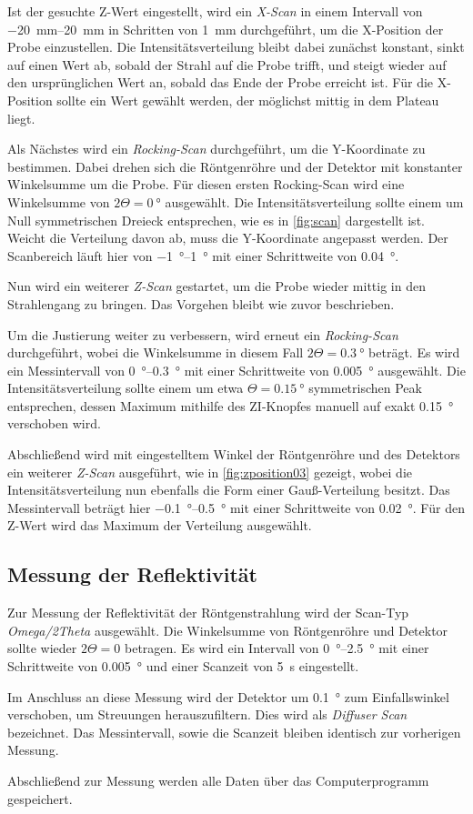 Ist der gesuchte Z-Wert eingestellt,
wird ein \emph{X-Scan} in einem Intervall von \SIrange{-20}{20}{\milli\meter} in Schritten von \SI{1}{\milli\meter} durchgeführt,
um die X-Position der Probe einzustellen.
Die Intensitätsverteilung bleibt dabei zunächst konstant,
sinkt auf einen Wert ab,
sobald der Strahl auf die Probe trifft,
und steigt wieder auf den ursprünglichen Wert an,
sobald das Ende der Probe erreicht ist.
Für die X-Position sollte ein Wert gewählt werden,
der möglichst mittig in dem Plateau liegt.

Als Nächstes wird ein \emph{Rocking-Scan} durchgeführt,
um die Y-Koordinate zu bestimmen.
Dabei drehen sich die Röntgenröhre und der Detektor mit konstanter Winkelsumme um die Probe.
Für diesen ersten Rocking-Scan wird eine Winkelsumme von $2 \Theta = \SI{0}{\degree}$ ausgewählt.
Die Intensitätsverteilung sollte einem um Null symmetrischen Dreieck entsprechen,
wie es in \autoref{fig:scan} dargestellt ist.
Weicht die Verteilung davon ab,
muss die Y-Koordinate angepasst werden.
Der Scanbereich läuft hier von \SIrange{-1}{1}{\degree} mit einer Schrittweite von \SI{0.04}{\degree}.

Nun wird ein weiterer \emph{Z-Scan} gestartet,
um die Probe wieder mittig in den Strahlengang zu bringen.
Das Vorgehen bleibt wie zuvor beschrieben.

Um die Justierung weiter zu verbessern,
wird erneut ein \emph{Rocking-Scan} durchgeführt,
wobei die Winkelsumme in diesem Fall $2 \Theta = \SI{0.3}{\degree}$ beträgt.
Es wird ein Messintervall von \SIrange{0}{0.3}{\degree} mit einer Schrittweite von \SI{0.005}{\degree} ausgewählt.
Die Intensitätsverteilung sollte einem um etwa $\Theta = \SI{0.15}{\degree}$ symmetrischen Peak entsprechen,
dessen Maximum mithilfe des ZI-Knopfes manuell auf exakt \SI{0.15}{\degree} verschoben wird.

Abschließend wird mit eingestelltem Winkel der Röntgenröhre und des Detektors ein weiterer \emph{Z-Scan} ausgeführt,
wie in \autoref{fig:zposition03} gezeigt,
wobei die Intensitätsverteilung nun ebenfalls die Form einer Gauß-Verteilung besitzt.
Das Messintervall beträgt hier \SIrange{-0.1}{0.5}{\degree} mit einer Schrittweite von \SI{0.02}{\degree}.
Für den Z-Wert wird das Maximum der Verteilung ausgewählt.


\subsection{Messung der Reflektivität}

Zur Messung der Reflektivität der Röntgenstrahlung wird der Scan-Typ \emph{Omega/2Theta} ausgewählt.
Die Winkelsumme von Röntgenröhre und Detektor sollte wieder $2 \Theta = 0$ betragen.
Es wird ein Intervall von \SIrange{0}{2.5}{\degree} mit einer Schrittweite von \SI{0.005}{\degree} und einer Scanzeit von \SI{5}{\second} eingestellt.

Im Anschluss an diese Messung wird der Detektor um \SI{0.1}{\degree} zum Einfallswinkel verschoben,
um Streuungen herauszufiltern.
Dies wird als \emph{Diffuser Scan} bezeichnet.
Das Messintervall,
sowie die Scanzeit bleiben identisch zur vorherigen Messung.

Abschließend zur Messung werden alle Daten über das Computerprogramm gespeichert.
